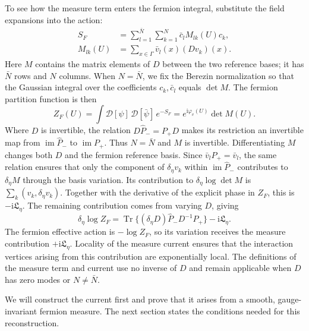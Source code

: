 \documentclass[11pt,a4paper]{article}
\theoremstyle{remark}
\DeclareMathOperator{\Tr}{Tr}
\DeclareMathOperator{\im}{im}
\newcommand{\ii}{\mathrm i}
\begin{document}
To see how the measure term enters the fermion integral,
substitute the field expansions into the action:
\begin{equation}
 \begin{split}
 S_F&=\sum_{l=1}^{\bar N}\sum_{k=1}^N
                 \bar c_l M_{lk}(U)c_k,\\
 M_{lk}(U)&=\sum_{x\in\Gamma}\bar v_l(x)(Dv_k)(x).
 \end{split}
\end{equation}
Here \(M\) contains the matrix elements of \(D\) between
the two reference bases; it has \(\bar N\) rows and \(N\)
columns. When \(N=\bar N\), we fix the Berezin normalization
so that the Gaussian integral over the coefficients \(c_k,\bar c_l\)
equals \(\det M\).
The fermion partition function is then
\begin{equation}
 Z_F(U)=\int\mathcal D[\psi]\,\mathcal D[\bar\psi]\,
                    e^{-S_F}
       =e^{\ii\varphi_v(U)}\det M(U).
\end{equation}
Where \(D\) is invertible, the relation
\(D\widehat P_-=P_+D\) makes its restriction an invertible map
from \(\im\widehat P_-\) to \(\im P_+\). Thus
\(N=\bar N\) and \(M\) is invertible. Differentiating
\(M\) changes both \(D\) and the fermion reference basis.
Since \(\bar v_lP_+=\bar v_l\), the same relation ensures
that only the component of \(\delta_\eta v_k\) within
\(\im\widehat P_-\) contributes to \(\delta_\eta M\)
through the basis variation. Its contribution
to \(\delta_\eta\log\det M\) is
\(\sum_k(v_k,\delta_\eta v_k)\). Together with the derivative
of the explicit phase in \(Z_F\), this is
\(-\ii\mathfrak L_\eta\). The remaining contribution comes
from varying \(D\), giving
\begin{equation}
 \delta_\eta\log Z_F
 =\Tr\{(\delta_\eta D)\widehat P_-D^{-1}P_+\}
       -\ii\mathfrak L_\eta.
 \label{eq:determinant-variation}
\end{equation}
The fermion
effective action is \(-\log Z_F\), so its variation receives
the measure contribution \(+\ii\mathfrak L_\eta\).
Locality of the measure current ensures that the interaction
vertices arising from this contribution are exponentially local.
The definitions of the measure term and current use no
inverse of \(D\) and remain applicable when \(D\) has zero
modes or \(N\ne\bar N\).

We will construct the current first and prove that it arises
from a smooth, gauge-invariant fermion measure. The next
section states the conditions needed for this reconstruction.
\end{document}
